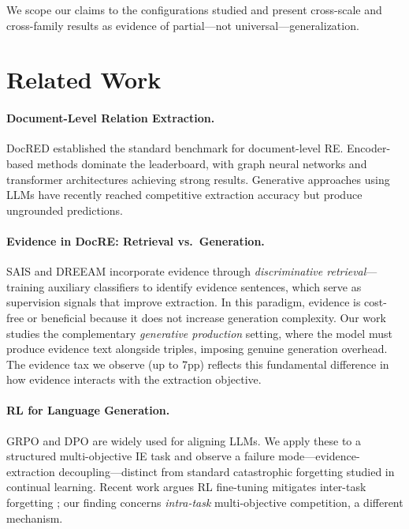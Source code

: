 \documentclass[11pt,a4paper]{article}
\begin{document}
We scope our claims to the configurations studied and present cross-scale and cross-family results as evidence of partial---not universal---generalization.

\section{Related Work}
\label{sec:related}

\paragraph{Document-Level Relation Extraction.}
DocRED \cite{yao2019docred} established the standard benchmark for document-level RE.
Encoder-based methods dominate the leaderboard, with graph neural networks \cite{zeng2020double, nan2020reasoning} and transformer architectures achieving strong results.
Generative approaches using LLMs \cite{wadhwa2023revisiting} have recently reached competitive extraction accuracy but produce ungrounded predictions.

\paragraph{Evidence in DocRE: Retrieval vs.\ Generation.}
SAIS \cite{xu2022sais} and DREEAM \cite{ma2023dreeam} incorporate evidence through \emph{discriminative retrieval}---training auxiliary classifiers to identify evidence sentences, which serve as supervision signals that improve extraction.
In this paradigm, evidence is cost-free or beneficial because it does not increase generation complexity.
Our work studies the complementary \emph{generative production} setting, where the model must produce evidence text alongside triples, imposing genuine generation overhead.
The evidence tax we observe (up to 7pp) reflects this fundamental difference in how evidence interacts with the extraction objective.

\paragraph{RL for Language Generation.}
GRPO \cite{shao2024deepseekmath} and DPO \cite{rafailov2024direct} are widely used for aligning LLMs.
We apply these to a structured multi-objective IE task and observe a failure mode---evidence-extraction decoupling---distinct from standard catastrophic forgetting studied in continual learning.
Recent work argues RL fine-tuning mitigates inter-task forgetting \cite{rlretain2025}; our finding concerns \emph{intra-task} multi-objective competition, a different mechanism.
\end{document}
